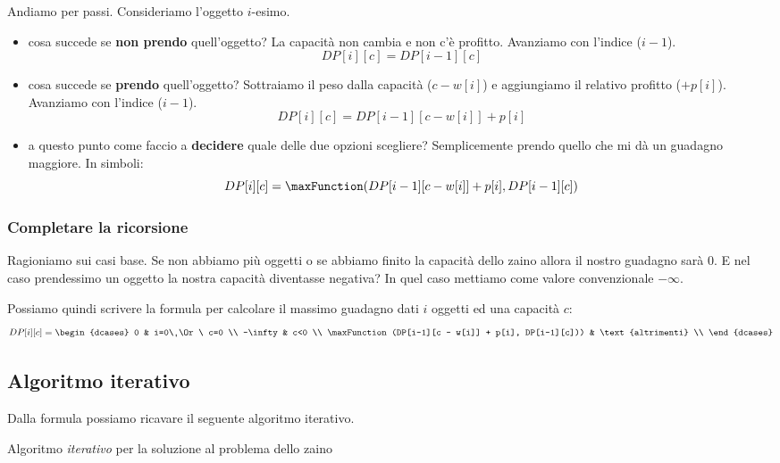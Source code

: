Andiamo per passi.
Consideriamo l'oggetto \(i\)-esimo.
\begin{itemize}
    \item cosa succede se \textbf{non prendo} quell'oggetto?
    La capacità non cambia e non c'è profitto.
    Avanziamo con l'indice (\(i-1\)).
    \[DP[i][c] = DP[i-1][c]\]

    \item cosa succede se \textbf{prendo} quell'oggetto?
    Sottraiamo il peso dalla capacità (\(c - w[i]\)) e aggiungiamo il relativo profitto (\(+ p[i]\)).
    Avanziamo con l'indice (\(i-1\)).
    \[DP[i][c] = DP[i-1][c - w[i]] + p[i]\]

    \item a questo punto come faccio a \textbf{decidere} quale delle due opzioni scegliere?
    Semplicemente prendo quello che mi dà un guadagno maggiore.
    In simboli:
    \[DP[i][c] = \maxFunction(DP[i-1][c - w[i]] + p[i], DP[i-1][c])\]
\end{itemize}

\subsubsection{Completare la ricorsione}

Ragioniamo sui casi base.
Se non abbiamo più oggetti o se abbiamo finito la capacità dello zaino allora il nostro guadagno sarà \(0\).
E nel caso prendessimo un oggetto la nostra capacità diventasse negativa?
In quel caso mettiamo come valore convenzionale \(-\infty\).

Possiamo quindi scrivere la formula per calcolare il massimo guadagno dati \(i\) oggetti ed una capacità \(c\):
\[
    DP[i][c] =
    \begin{dcases}
        0                                                   & i=0\ \Or\ c=0     \\
        -\infty                                             & c<0               \\
        \maxFunction(DP[i-1][c - w[i]] + p[i], DP[i-1][c])) & \text{altrimenti} \\
    \end{dcases}
\]

\subsection{Algoritmo iterativo}

Dalla formula possiamo ricavare il seguente algoritmo iterativo.
\begin{algorithm}[H]
    \caption{Algoritmo \emph{iterativo} per la soluzione al problema dello zaino}
    
\end{algorithm}

